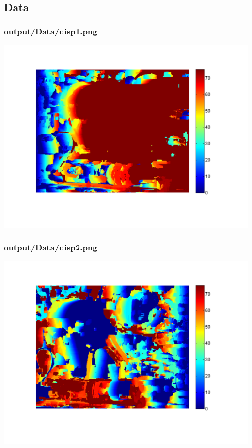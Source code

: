 \subsection{Data}
\subsubsection{output/Data/disp1.png}
    \includegraphics[scale=0.5]{output/Data/disp1.png}

\subsubsection{output/Data/disp2.png}
    \includegraphics[scale=0.5]{output/Data/disp2.png}

